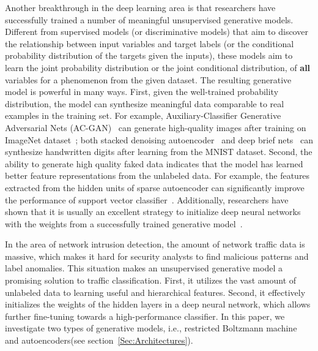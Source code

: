 Another breakthrough in the deep learning area is that researchers have successfully trained
a number of meaningful unsupervised generative models.
Different from supervised models (or discriminative models) that aim to discover
the relationship between input variables and target labels (or the conditional probability distribution of the targets given the inputs),
these models aim to learn the joint probability distribution or the joint conditional distribution,
of \textbf{all} variables for a phenomenon from the given dataset.
The resulting generative model is powerful in many ways.
First, given the well-trained probability distribution, the model can synthesize meaningful data
comparable to real examples in the training set.
For example, Auxiliary-Classifier Generative Adversarial Nets (AC-GAN)~\cite{AC-GAN} can generate  high-quality images after training on ImageNet dataset~\cite{ImageNet};
both stacked denoising autoencoder~\cite{DenoiseAE} and deep brief nets~\cite{DeepBeliefNets} can synthesize handwritten digits after learning from the MNIST dataset.
Second, the ability to generate high quality faked data indicates that
the model has learned better feature representations from the unlabeled data.
For example, the features extracted from the hidden units of sparse autoencoder
can significantly improve the performance of support vector classifier~\cite{SparseAE}.
Additionally, researchers have shown that it is usually an excellent strategy to initialize deep neural networks with the weights from a successfully trained generative model~\cite{DeepBeliefNets, Momentum}.

In the area of network intrusion detection, the amount of network traffic data is massive,
which makes it hard for security analysts to find malicious patterns and label anomalies.
This situation makes an unsupervised generative model a promising solution
to traffic classification. %
First, it utilizes the vast amount of unlabeled data to learning useful and hierarchical features. Second, it effectively initializes the weights of the hidden layers in a deep neural network, which allows further fine-tuning towards a high-performance classifier.
In this paper, we investigate two types of generative models, i.e.,
restricted Boltzmann machine and autoencoders(see section~\ref{Sec:Architectures}). 



